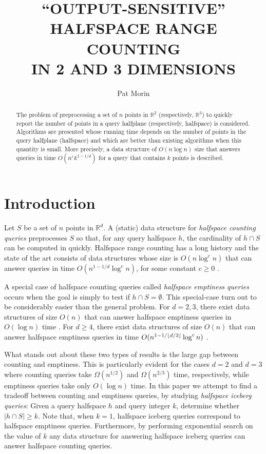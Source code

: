 \documentclass[lotsofwhite]{patmorin}
\title{\MakeUppercase{``Output-Sensitive'' Halfspace Range Counting}
           \\ \MakeUppercase{in 2 and 3 Dimensions}}
\author{Pat Morin}
\date{}
\newcommand{\eps}{\varepsilon}
\begin{document}
\maketitle
\begin{abstract}
The problem of preprocessing a set of $n$ points in $\mathbb{R}^2$
(respectively, $\mathbb{R}^3$) to quickly report the number of points
in a query halfplane (respectively, halfspace) is considered.
Algorithms are presented whose running time depends on the number of
points in the query halfplane (halfspace) and which are better than
existing algorithms when this quantity is small.  More precisely, a
data structure of $O(n\log n)$ size that answers queries in time
$O(n^{\eps}k^{1-1/d})$ for a query that contains $k$ points is
described.
\end{abstract}

\section{Introduction}

Let $S$ be a set of $n$ points in $\mathbb{R}^d$.  A (static) data
structure for \emph{halfspace counting queries} preprocesses $S$ so
that, for any query halfspace $h$, the cardinality of $h\cap S$ can be
computed in quickly. Halfspace range counting has a long history
\cite{aeXX} and the state of the art consists of data structures whose
size is $O(n\log^c n)$ that can answer queries in time
$O(n^{1-1/d}\log^c n)$, for some constant $c\ge 0$ \cite{X}.  

A special case of halfspace counting queries called \emph{halfspace
emptiness queries} occurs when the goal is simply to test if $h\cap
S=\emptyset$.  This special-case turn out to be considerably easier
than the general problem.  For $d=2,3$, there exist data structures of
size $O(n)$ that can answer halfspace emptiness queries in $O(\log n)$
time \cite{preparata-shamos,dobkin-kirkpatrick,dhks}. For $d\ge 4$,
there exist data structures of size $O(n)$ that can answer halfspace
emptiness queries in time $O(n^{1-1/\left\lfloor d/2 \right\rfloor}\log^c n)$
\cite{matousek-shallow}.

What stands out about these two types of results is the large gap
between counting and emptiness.  This is particularly evident for the
cases $d=2$ and $d=3$ where counting queries take $\Omega(n^{1/2})$
and $\Omega(n^{2/3})$ time, respectively, while emptiness queries take
only $O(\log n)$ time.  In this paper we attempt to find a tradeoff
between counting and emptiness queries, by studying \emph{halfspace
iceberg queries}:  Given a query halfspace $h$ and query integer $k$,
determine whether $|h\cap S|\ge k$. Note that, when $k=1$, halfspace
iceberg queries correspond to  halfspace emptiness queries.
Furthermore, by performing exponential search \cite{tarjan} on the
value of $k$ any data structure for answering halfspace iceberg
queries can answer halfspace counting queries.
\end{document}
